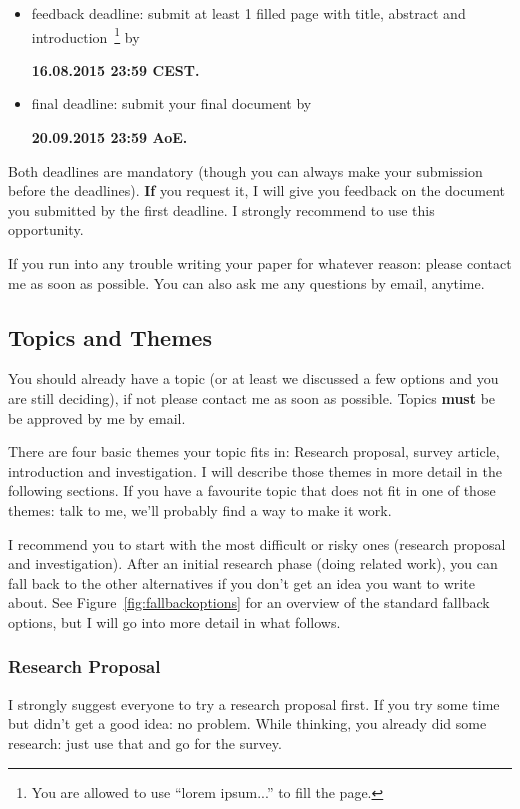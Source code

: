 \documentclass[twocolumn, a4paper, 10pt]{article}
\begin{document}
\begin{itemize}
\item feedback deadline: submit at least 1 filled page with title, abstract and introduction~\footnote{You are allowed to use ``lorem ipsum...'' to fill the page.} by
	\begin{center}
	\bfseries
		16.08.2015 23:59 CEST.
	\end{center}
\item final deadline: submit your final document by
	\begin{center}
	\bfseries
		20.09.2015 23:59 AoE.
	\end{center}
\end{itemize}

Both deadlines are mandatory (though you can always make your submission before the deadlines). 
\textbf{If} you request it, I will give you feedback on the document you submitted by the first deadline. I strongly recommend to use this opportunity.

If you run into any trouble writing your paper for whatever reason: please contact me as soon as possible. You can also ask me any questions by email, anytime.

\subsection{Topics and Themes}
You should already have a topic (or at least we discussed a few options and you are still deciding), if not please contact me as soon as possible. Topics \textbf{must} be be approved by me by email.  

There are four basic themes your topic fits in: Research proposal, survey article, introduction and investigation. I will describe those themes in more detail in the following sections.
If you have a favourite topic that does not fit in one of those themes: talk to me, we'll probably find a way to make it work. 

I recommend you to start with the most difficult or risky ones (research proposal and investigation). After an initial research phase (doing related work), you can fall back to the other alternatives if you don't get an idea you want to write about.  See Figure~\ref{fig:fallbackoptions} for an overview of the standard fallback options, but I will go into more detail in what follows.
 


\subsubsection{Research Proposal}
I strongly suggest everyone to try a research proposal first. If you try some time but didn't get a good idea: no problem. While thinking, you already did some research: just use that and go for the survey. 
\end{document}
